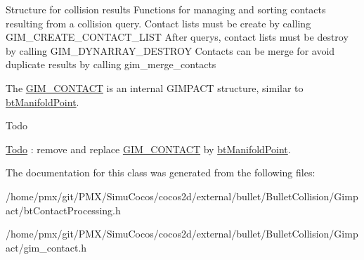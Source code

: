 Structure for collision results Functions for managing and sorting contacts resulting from a collision query. Contact lists must be create by calling G\+I\+M\+\_\+\+C\+R\+E\+A\+T\+E\+\_\+\+C\+O\+N\+T\+A\+C\+T\+\_\+\+L\+I\+ST After querys, contact lists must be destroy by calling G\+I\+M\+\_\+\+D\+Y\+N\+A\+R\+R\+A\+Y\+\_\+\+D\+E\+S\+T\+R\+OY Contacts can be merge for avoid duplicate results by calling gim\+\_\+merge\+\_\+contacts

The \hyperlink{classGIM__CONTACT}{G\+I\+M\+\_\+\+C\+O\+N\+T\+A\+CT} is an internal G\+I\+M\+P\+A\+CT structure, similar to \hyperlink{classbtManifoldPoint}{bt\+Manifold\+Point}. \begin{DoxyRefDesc}{Todo}
\item[\hyperlink{todo__todo000051}{Todo}]\+: remove and replace \hyperlink{classGIM__CONTACT}{G\+I\+M\+\_\+\+C\+O\+N\+T\+A\+CT} by \hyperlink{classbtManifoldPoint}{bt\+Manifold\+Point}. \end{DoxyRefDesc}


The documentation for this class was generated from the following files\+:\begin{DoxyCompactItemize}
\item 
/home/pmx/git/\+P\+M\+X/\+Simu\+Cocos/cocos2d/external/bullet/\+Bullet\+Collision/\+Gimpact/bt\+Contact\+Processing.\+h\item 
/home/pmx/git/\+P\+M\+X/\+Simu\+Cocos/cocos2d/external/bullet/\+Bullet\+Collision/\+Gimpact/gim\+\_\+contact.\+h\end{DoxyCompactItemize}
